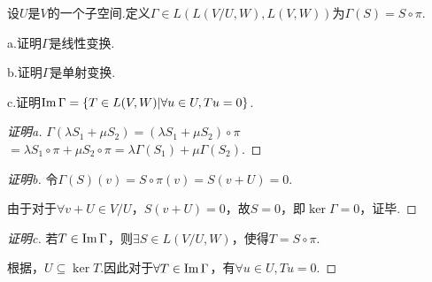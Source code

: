 \begin{problem}[20]\label{3.E.20}
    设\(U\)是\(V\)的一个子空间.定义\(\Gamma \in L(L(V/U,W),L(V,W))\)为\(\Gamma(S)=S \circ \pi\).

    a.证明\(\Gamma\)是线性变换.
    
    b.证明\(\Gamma\)是单射变换.
    
    c.证明\(\operatorname{Im}  \Gamma=\{T \in L(V,W)|\forall u \in U,Tu=0 \}\).
\end{problem}

\begin{proof}[证明a]
    \(\Gamma(\lambda S_1+\mu S_2)=(\lambda S_1+\mu S_2) \circ \pi\)
    \(=\lambda S_1 \circ \pi+\mu S_2 \circ \pi=\lambda \Gamma(S_1)+\mu \Gamma(S_2)\).
\end{proof}

\begin{proof}[证明b]
    令\(\Gamma(S)(v)=S \circ \pi(v)=S(v+U)=0\).

    由于对于\(\forall v+U \in V/U\)，\(S(v+U)=0\)，故\(S=0\)，即\(\ker  \Gamma=0\)，证毕.
\end{proof}

\begin{proof}[证明c]
    若\(T \in \operatorname{Im}  \Gamma\)，则\(\exists S \in L(V/U,W)\)，使得\(T=S \circ \pi\).

    根据，\(U \subseteq \ker T\).因此对于\(\forall T \in \operatorname{Im} \Gamma\)，有\(\forall u \in U,Tu=0\).    
\end{proof}

